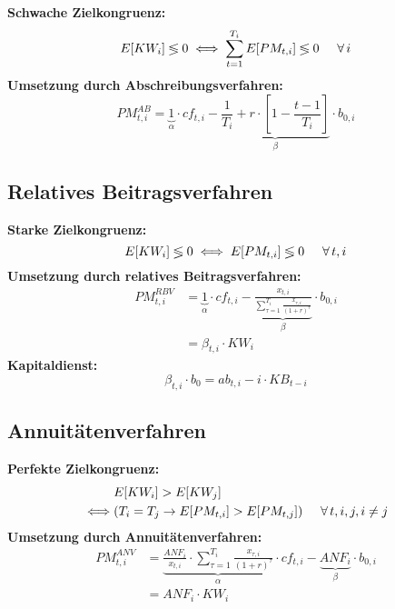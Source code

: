 \documentclass[leqno]{scrartcl}
\begin{document}
\begin{multicols}{4}
\textbf{Schwache Zielkongruenz:}
  \begin{equation*}
    E[KW_i] \lessgtr 0 \iff \sum^{T_i}_{t=1} E[PM_{t,i}] \lessgtr 0 \hspace{0.5cm} \forall\,i
  \end{equation*}
\textbf{Umsetzung durch Abschreibungsverfahren:}
  \begin{equation*}
    PM^{AB}_{t,i} = \underbrace{1}_{\alpha} \cdot cf_{t,i} - \underbrace{\frac{1}{T_i}+r \cdot \left[1-\frac{t-1}{T_i}\right]}_{\beta} \cdot b_{0,i}
  \end{equation*}

\subsection{Relatives Beitragsverfahren}

\textbf{Starke Zielkongruenz:}
  \begin{equation*}
    E[KW_i] \lessgtr 0 \iff E[PM_{t,i}] \lessgtr 0 \hspace{0.5cm} \forall\, t,i
  \end{equation*}
\textbf{Umsetzung durch relatives Beitragsverfahren:}
  \begin{equation*}
    \begin{split}
    PM^{RBV}_{t,i} &= \underbrace{1}_{\alpha} \cdot cf_{t,i} - \underbrace{\frac{x_{t,i}}{\sum^{T_i}_{\tau=1}\frac{x_{\tau,i}}{(1+r)^{\tau}}}}_{\beta} \cdot b_{0,i}\\
      & = \beta_{t,i} \cdot KW_i
    \end{split}
  \end{equation*}
\textbf{Kapitaldienst:}
  \begin{equation*}
    \beta_{t,i} \cdot b_0 = ab_{t,i} - i\cdot KB_{t-i}
  \end{equation*}

\subsection{Annuitätenverfahren}

\textbf{Perfekte Zielkongruenz:}
  \begin{align*}
    &E[KW_i] > E[KW_j]\\
    \iff & ( T_i = T_j \to E[PM_{t,i}] > E[PM_{t,j}]) \hspace{0.5cm} \forall\, t,i,j,i \neq j
  \end{align*}
\textbf{Umsetzung durch Annuitätenverfahren:}
  \begin{equation*}
    \begin{split}
        PM^{ANV}_{t,i} &= \underbrace{\frac{ANF_i}{x_{t,i}} \cdot \sum^{T_i}_{\tau=1}\frac{x_{\tau,i}}{(1+r)^{\tau}}}_{\alpha} \cdot cf_{t,i} - \underbrace{ANF_i}_{\beta} \cdot b_{0,i}\\
 & = ANF_i \cdot KW_i
    \end{split}
  \end{equation*}


\end{multicols}
\end{document}
